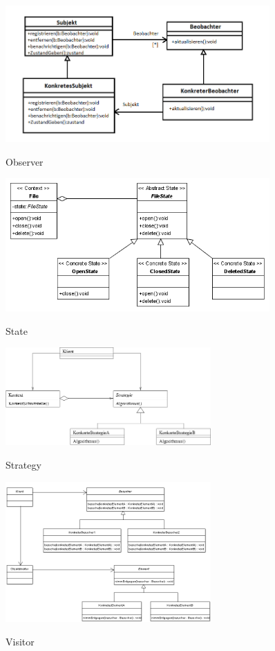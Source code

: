 \begin{figure}[htb]
	\centering
	\begin{minipage}[t]{0.45\linewidth}
		\centering
		\includegraphics[width=0.9\textwidth]{images/observer}
		\label{fig:observer}
		\caption{Observer}
	\end{minipage}%
	\hfill
	\begin{minipage}[t]{0.45\linewidth}
		\centering
		\includegraphics[width=0.9\textwidth]{images/state}
		\label{fig:state}
		\caption{State}
	\end{minipage}
\end{figure}

\begin{figure}[htb]
	\centering
	\includegraphics[width=0.7\textwidth]{images/strategy}
	\label{fig:strategy}
	\caption{Strategy}
\end{figure}
\begin{figure}
	\centering
	\includegraphics[width=0.7\textwidth]{images/visitor}
	\label{fig:visitor}
	\caption{Visitor}
\end{figure}


